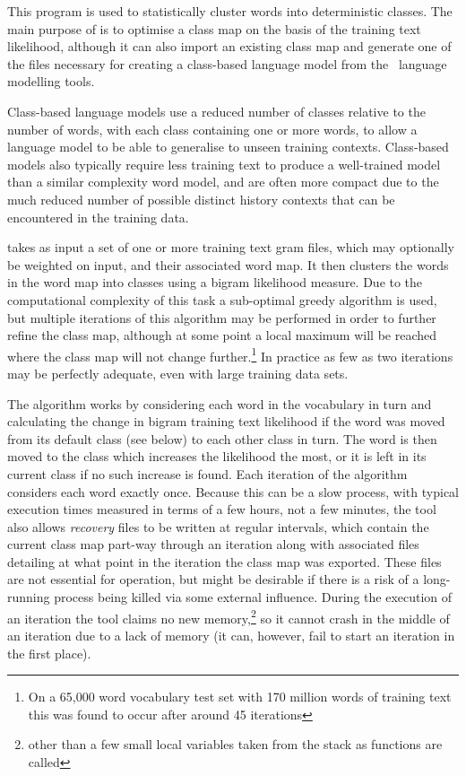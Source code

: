 %
%

\newpage
{}


This program is used to statistically cluster words into deterministic
classes.  The main purpose of  is to optimise a class
map on the basis of the training text likelihood, although it can also
import an existing class map and generate one of the files necessary
for creating a class-based language model from the \HTK\ language
modelling tools.

Class-based language models use a reduced number of classes relative
to the number of words, with each class containing one or more words,
to allow a language model to be able to generalise to unseen training
contexts.  Class-based models also typically require less training
text to produce a well-trained model than a similar complexity word
model, and are often more compact due to the much reduced number of
possible distinct history contexts that can be encountered in the
training data.

 takes as input a set of one or more training text gram
files, which may optionally be weighted on input, and their associated
word map.  It then clusters the words in the word map into classes
using a bigram likelihood measure.  Due to the computational
complexity of this task a sub-optimal greedy algorithm is used, but
multiple iterations of this algorithm may be performed in order to
further refine the class map, although at some point a local maximum
will be reached where the class map will not change
further.\footnote{On a 65,000 word vocabulary test set with 170 million
words of training text this was found to occur after around 45
iterations}  In practice as few as two iterations may be perfectly
adequate, even with large training data sets.

The algorithm works by considering each word in the vocabulary in turn
and calculating the change in bigram training text likelihood if the
word was moved from its default class (see below) to each other class
in turn.  The word is then moved to the class which increases the
likelihood the most, or it is left in its current class if no such
increase is found.  Each iteration of the algorithm considers each
word exactly once.  Because this can be a slow process, with typical
execution times measured in terms of a few hours, not a few minutes,
the  tool also allows \textit{recovery} files to be written
at regular intervals, which contain the current class map part-way
through an iteration along with associated files detailing at what
point in the iteration the class map was exported.  These files are
not essential for operation, but might be desirable if there is a risk
of a long-running process being killed via some external influence.
During the execution of an iteration the tool claims no new
memory,\footnote{other than a few small local variables taken from the
stack as functions are called} so it cannot crash
in the middle of an iteration due to a lack of memory (it can,
however, fail to start an iteration in the first place).

